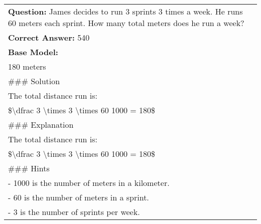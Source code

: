 \begin{table*}[h]

\begin{center}

\begin{tabular}{|p{14cm}|}
\toprule
\textbf{Question:} James decides to run 3 sprints 3 times a week.  He runs 60 meters each sprint.  How many total meters does he run a week? \\
\textbf{Correct Answer:} 540 \\
\midrule
\textbf{Base Model:} \\
180 meters \\ 
\#\#\# Solution \\
The total distance run is: \\
\$\textbackslash dfrac {3 \textbackslash times 3 \textbackslash times 60} {1000} = 180\$\\
\#\#\# Explanation \\
The total distance run is:\\
\$\textbackslash dfrac {3 \textbackslash times 3 \textbackslash times 60} {1000} = 180\$\\
\#\#\# Hints\\
- 1000 is the number of meters in a kilometer.\\
- 60 is the number of meters in a sprint.\\
- 3 is the number of sprints per week.\\


\end{tabular}
\end{center}
\end{table*}
